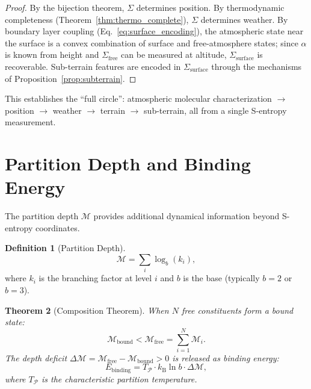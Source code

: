 \documentclass[twocolumn,10pt]{article}
\newtheorem{theorem}{Theorem}[section]
\theoremstyle{definition}
\newtheorem{definition}[theorem]{Definition}
\newcommand{\kB}{k_{\mathrm{B}}}
\begin{document}
\begin{proof}
By the bijection theorem, $\Sigma$ determines position. By thermodynamic completeness (Theorem~\ref{thm:thermo_complete}), $\Sigma$ determines weather. By boundary layer coupling (Eq.~\eqref{eq:surface_encoding}), the atmospheric state near the surface is a convex combination of surface and free-atmosphere states; since $\alpha$ is known from height and $\Sigma_{\mathrm{free}}$ can be measured at altitude, $\Sigma_{\mathrm{surface}}$ is recoverable. Sub-terrain features are encoded in $\Sigma_{\mathrm{surface}}$ through the mechanisms of Proposition~\ref{prop:subterrain}.
\end{proof}

This establishes the ``full circle'': atmospheric molecular characterization $\to$ position $\to$ weather $\to$ terrain $\to$ sub-terrain, all from a single S-entropy measurement.

\section{Partition Depth and Binding Energy}\label{sec:partition_depth}

The partition depth $\mathcal{M}$ provides additional dynamical information beyond S-entropy coordinates.

\begin{definition}[Partition Depth]\label{def:partition_depth}
\begin{equation}\label{eq:partition_depth}
    \mathcal{M} = \sum_i \log_b(k_i),
\end{equation}
where $k_i$ is the branching factor at level $i$ and $b$ is the base (typically $b = 2$ or $b = 3$).
\end{definition}

\begin{theorem}[Composition Theorem]\label{thm:composition}
When $N$ free constituents form a bound state:
\begin{equation}\label{eq:bound_depth}
    \mathcal{M}_{\mathrm{bound}} < \mathcal{M}_{\mathrm{free}} = \sum_{i=1}^{N}\mathcal{M}_i.
\end{equation}
The depth deficit $\Delta\mathcal{M} = \mathcal{M}_{\mathrm{free}} - \mathcal{M}_{\mathrm{bound}} > 0$ is released as binding energy:
\begin{equation}\label{eq:binding_energy}
    E_{\mathrm{binding}} = T_{\mathcal{P}} \cdot \kB\ln b \cdot \Delta\mathcal{M},
\end{equation}
where $T_{\mathcal{P}}$ is the characteristic partition temperature.
\end{theorem}
\end{document}
